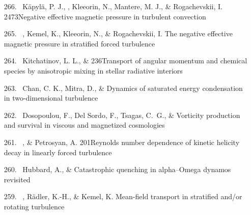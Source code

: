 \begin{itemize}
\item[{266.}~]
K\"apyl\"a, P. J., \Brandenburg, Kleeorin, N., Mantere, M. J., \& Rogachevskii, I.
{2473}{Negative effective magnetic pressure in turbulent convection}

\item[{265.}~]
\Brandenburg, Kemel, K., Kleeorin, N., \& Rogachevskii, I.
{The negative effective magnetic pressure in stratified forced turbulence}

\item[{264.}~]
Kitchatinov, L. L., \& \Brandenburg{}
{236}{Transport of angular momentum and chemical species by anisotropic mixing in stellar radiative interiors}

\item[{263.}~]
Chan, C. K., Mitra, D., \& \Brandenburg{}
{Dynamics of saturated energy condensation in two-dimensional turbulence}

\item[{262.}~]
Dosopoulou, F., Del Sordo, F., Tsagas, C.\ G., \& \Brandenburg{}
{Vorticity production and survival in viscous and magnetized cosmologies}

\item[{261.}~]
\Brandenburg, \& Petrosyan, A.
{201}{Reynolds number dependence of kinetic helicity decay in linearly forced turbulence}

\item[{260.}~]
Hubbard, A., \& \Brandenburg{}
{Catastrophic quenching in alpha--Omega dynamos revisited}

\item[{259.}~]
\Brandenburg, R\"adler, K.-H., \& Kemel, K.
{Mean-field transport in stratified and/or rotating turbulence}


\end{itemize}
